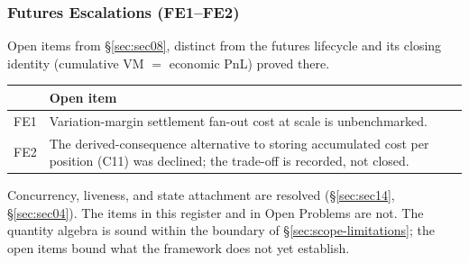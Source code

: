 \subsubsection{Futures Escalations (FE1--FE2)}

Open items from \S\ref{sec:sec08}, distinct from the futures lifecycle and its closing identity (cumulative VM $=$ economic PnL) proved there.

\begin{longtable}{@{}p{0.5cm}p{12.6cm}@{}}
\toprule
& \textbf{Open item} \\
\midrule
\endhead
FE1 & Variation-margin settlement fan-out cost at scale is unbenchmarked. \\
FE2 & The derived-consequence alternative to storing accumulated cost per position (C11) was declined; the trade-off is recorded, not closed. \\
\bottomrule
\end{longtable}

\noindent Concurrency, liveness, and state attachment are resolved (\S\ref{sec:sec14}, \S\ref{sec:sec04}). The items in this register and in Open Problems are not. The quantity algebra is sound within the boundary of \S\ref{sec:scope-limitations}; the open items bound what the framework does not yet establish.

\clearpage
